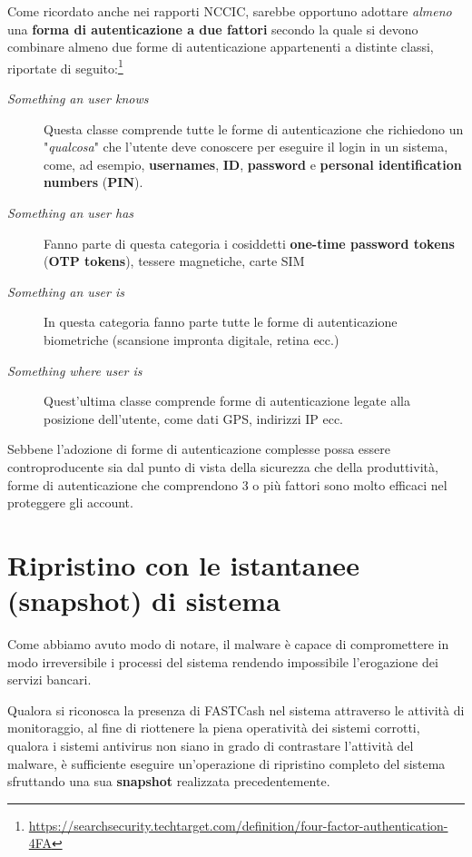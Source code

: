 \documentclass[10pt,a4paper, titlepage]{report}
\begin{document}
Come ricordato anche nei rapporti NCCIC, sarebbe opportuno adottare \textit{almeno} una \textbf{forma di autenticazione a due fattori} secondo la quale si devono combinare almeno due forme di autenticazione appartenenti a distinte classi, riportate di seguito:\footnote{\url{https://searchsecurity.techtarget.com/definition/four-factor-authentication-4FA}}
\begin{description}
\item[\textit{Something an user knows}] Questa classe comprende tutte le forme di autenticazione che richiedono un "\textit{qualcosa}" che l'utente deve conoscere per eseguire il login in un sistema, come, ad esempio, \textbf{usernames}, \textbf{ID}, \textbf{password} e \textbf{personal identification numbers} (\textbf{PIN}).
\item[\textit{Something an user has}] Fanno parte di questa categoria i cosiddetti \textbf{one-time password tokens} (\textbf{OTP tokens}), tessere magnetiche, carte SIM
\item[\textit{Something an user is}] In questa categoria fanno parte tutte le forme di autenticazione biometriche (scansione impronta digitale, retina ecc.)
\item[\textit{Something where user is}] Quest'ultima classe comprende forme di autenticazione legate alla posizione dell'utente, come dati  GPS, indirizzi IP ecc.
\end{description} 

Sebbene l'adozione di forme di autenticazione complesse possa essere controproducente sia dal punto di vista della sicurezza che della produttività, forme di autenticazione che comprendono 3 o più fattori sono molto efficaci nel proteggere gli account.

\section{Ripristino con le istantanee (snapshot) di sistema}

Come abbiamo avuto modo di notare, il malware è capace di compromettere in modo irreversibile i processi del sistema rendendo impossibile l'erogazione dei servizi bancari.

Qualora si riconosca la presenza di FASTCash nel sistema attraverso le attività di monitoraggio, al fine di riottenere la piena operatività dei sistemi corrotti, qualora i sistemi antivirus non siano in grado di contrastare l'attività del malware, è sufficiente eseguire un'operazione di ripristino completo del sistema sfruttando una sua \textbf{snapshot} realizzata precedentemente. 
\end{document}
